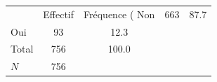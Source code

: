 {
\def\sym#1{\ifmmode^{#1}\else\(^{#1}\)\fi}
\begin{tabular}{l*{1}{cc}}
\toprule
            &    Effectif&Fréquence (%
\midrule
Non         &         663&        87.7\\
Oui         &          93&        12.3\\
Total       &         756&       100.0\\
\midrule
\(N\)       &         756&            \\
\bottomrule
\end{tabular}
}
